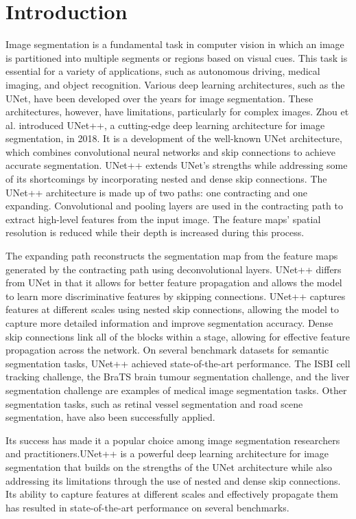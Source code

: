 \documentclass[conference]{IEEEtran}
\begin{document}
\section{Introduction}
Image segmentation is a fundamental task in computer vision in which an image is partitioned into multiple segments or regions based on visual cues. This task is essential for a variety of applications, such as autonomous driving, medical imaging, and object recognition. Various deep learning architectures, such as the UNet, have been developed over the years for image segmentation.
These architectures, however, have limitations, particularly for complex images. Zhou et al. introduced UNet++, a cutting-edge deep learning architecture for image segmentation, in 2018. It is a development of the well-known UNet architecture, which combines convolutional neural networks and skip connections to achieve accurate segmentation. UNet++ extends UNet's strengths while addressing some of its shortcomings by incorporating nested and dense skip connections.
The UNet++ architecture is made up of two paths: one contracting and one expanding. Convolutional and pooling layers are used in the contracting path to extract high-level features from the input image. The feature maps' spatial resolution is reduced while their depth is increased during this process.

The expanding path reconstructs the segmentation map from the feature maps generated by the contracting path using deconvolutional layers.
UNet++ differs from UNet in that it allows for better feature propagation and allows the model to learn more discriminative features by skipping connections. UNet++ captures features at different scales using nested skip connections, allowing the model to capture more detailed information and improve segmentation accuracy. Dense skip connections link all of the blocks within a stage, allowing for effective feature propagation across the network.
On several benchmark datasets for semantic segmentation tasks, UNet++ achieved state-of-the-art performance. The ISBI cell tracking challenge, the BraTS brain tumour segmentation challenge, and the liver segmentation challenge are examples of medical image segmentation tasks. Other segmentation tasks, such as retinal vessel segmentation and road scene segmentation, have also been successfully applied.

Its success has made it a popular choice among image segmentation researchers and practitioners.UNet++ is a powerful deep learning architecture for image segmentation that builds on the strengths of the UNet architecture while also addressing its limitations through the use of nested and dense skip connections. Its ability to capture features at different scales and effectively propagate them has resulted in state-of-the-art performance on several benchmarks.
\end{document}
